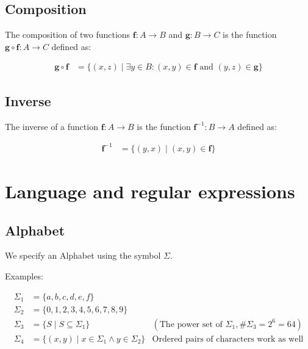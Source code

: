 \documentclass{article}
\begin{document}
\subsection{Composition}

The composition of two functions $\mathbf{f} : A \rightarrow B$ and $\mathbf{g} : B \rightarrow C$ is the function $\mathbf{g} \circ \mathbf{f} : A \rightarrow C$ defined as:

\begin{align*}
    \mathbf{g} \circ \mathbf{f} & = \{(x, z) \mid \exists y \in B : (x, y) \in \mathbf{f} \text{ and } (y, z) \in \mathbf{g}\}
\end{align*}

\subsection{Inverse}

The inverse of a function $\mathbf{f} : A \rightarrow B$ is the function $\mathbf{f}^{-1} : B \rightarrow A$ defined as:

\begin{align*}
    \mathbf{f}^{-1} & = \{(y, x) \mid (x, y) \in \mathbf{f}\}
\end{align*}

\section{Language and regular expressions}

\subsection{Alphabet}

We specify an Alphabet using the symbol $\Sigma$.

Examples:

\begin{align*}
    \Sigma_1 & = \{a, b, c, d, e, f\}                                                                                             \\
    \Sigma_2 & = \{0, 1, 2, 3, 4, 5, 6, 7, 8, 9\}                                                                                 \\
    \Sigma_3 & = \{S \mid S \subseteq \Sigma_1\}                     & (\text{The power set of } \Sigma_1, \#\Sigma_3 = 2^6 = 64) \\
    \Sigma_4 & = \{(x, y) \mid x \in \Sigma_1 \land y \in \Sigma_2\} & \text{Ordered pairs of characters work as well}
\end{align*}
\end{document}
